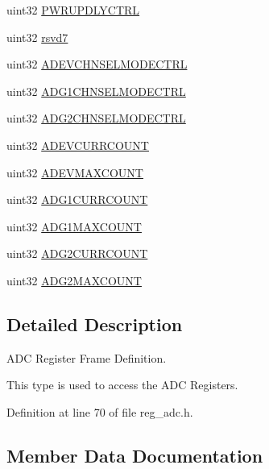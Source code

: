 \begin{DoxyCompactItemize}
uint32 \mbox{\hyperlink{structadcBase_a21f4e9dc776bc441153a528cb7dc7da0}{P\+W\+R\+U\+P\+D\+L\+Y\+C\+T\+RL}}
\item 
uint32 \mbox{\hyperlink{structadcBase_ab7c3a3fe7079c606778288bb08c18bf1}{rsvd7}}
\item 
uint32 \mbox{\hyperlink{structadcBase_a16fa2afe720fe6ffb0b9150a424ff2a4}{A\+D\+E\+V\+C\+H\+N\+S\+E\+L\+M\+O\+D\+E\+C\+T\+RL}}
\item 
uint32 \mbox{\hyperlink{structadcBase_aef9b320d47905c02968d0cdb70164cbe}{A\+D\+G1\+C\+H\+N\+S\+E\+L\+M\+O\+D\+E\+C\+T\+RL}}
\item 
uint32 \mbox{\hyperlink{structadcBase_a3bfe2797d5c3de783aa36cc5c21c8ba2}{A\+D\+G2\+C\+H\+N\+S\+E\+L\+M\+O\+D\+E\+C\+T\+RL}}
\item 
uint32 \mbox{\hyperlink{structadcBase_afbe3a9d6e2a36d6c71d68e38ed53295a}{A\+D\+E\+V\+C\+U\+R\+R\+C\+O\+U\+NT}}
\item 
uint32 \mbox{\hyperlink{structadcBase_a53f4dca64ba9d8644bdebb754af49497}{A\+D\+E\+V\+M\+A\+X\+C\+O\+U\+NT}}
\item 
uint32 \mbox{\hyperlink{structadcBase_a43c84a9e152f826cb2166569d4c4ae37}{A\+D\+G1\+C\+U\+R\+R\+C\+O\+U\+NT}}
\item 
uint32 \mbox{\hyperlink{structadcBase_a1ac1e71ad1c4791f7f6c4e0406717858}{A\+D\+G1\+M\+A\+X\+C\+O\+U\+NT}}
\item 
uint32 \mbox{\hyperlink{structadcBase_ac3bbc70fbb9e8d4c2cbd3b3d4ed648ec}{A\+D\+G2\+C\+U\+R\+R\+C\+O\+U\+NT}}
\item 
uint32 \mbox{\hyperlink{structadcBase_af0ec2c5fb4057a32b3f9431cc77a4a78}{A\+D\+G2\+M\+A\+X\+C\+O\+U\+NT}}
\end{DoxyCompactItemize}


\subsection{Detailed Description}
A\+DC Register Frame Definition. 

This type is used to access the A\+DC Registers. 

Definition at line 70 of file reg\+\_\+adc.\+h.



\subsection{Member Data Documentation}
\mbox{\label{structadcBase_a16fa2afe720fe6ffb0b9150a424ff2a4}} 
